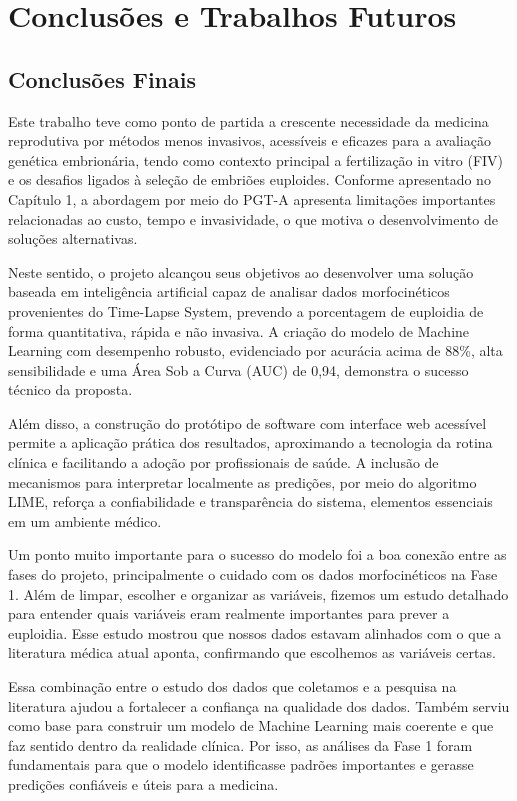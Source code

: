 \chapter[Conclusões e Trabalhos Futuros]{Conclusões e Trabalhos Futuros}

\section{Conclusões Finais}
Este trabalho teve como ponto de partida a crescente necessidade da medicina reprodutiva por métodos menos invasivos, acessíveis e eficazes para a avaliação genética embrionária, tendo como contexto principal a fertilização in vitro (FIV) e os desafios ligados à seleção de embriões euploides. Conforme apresentado no Capítulo 1, a abordagem por meio do PGT-A apresenta limitações importantes relacionadas ao custo, tempo e invasividade, o que motiva o desenvolvimento de soluções alternativas.

Neste sentido, o projeto alcançou seus objetivos ao desenvolver uma solução baseada em inteligência artificial capaz de analisar dados morfocinéticos provenientes do Time-Lapse System, prevendo a porcentagem de euploidia de forma quantitativa, rápida e não invasiva. A criação do modelo de Machine Learning com desempenho robusto, evidenciado por acurácia acima de 88\%, alta sensibilidade e uma Área Sob a Curva (AUC) de 0,94, demonstra o sucesso técnico da proposta.

Além disso, a construção do protótipo de software com interface web acessível permite a aplicação prática dos resultados, aproximando a tecnologia da rotina clínica e facilitando a adoção por profissionais de saúde. A inclusão de mecanismos para interpretar localmente as predições, por meio do algoritmo LIME, reforça a confiabilidade e transparência do sistema, elementos essenciais em um ambiente médico.

Um ponto muito importante para o sucesso do modelo foi a boa conexão entre as fases do projeto, principalmente o cuidado com os dados morfocinéticos na Fase 1. Além de limpar, escolher e organizar as variáveis, fizemos um estudo detalhado para entender quais variáveis eram realmente importantes para prever a euploidia. Esse estudo mostrou que nossos dados estavam alinhados com o que a literatura médica atual aponta, confirmando que escolhemos as variáveis certas.

Essa combinação entre o estudo dos dados que coletamos e a pesquisa na literatura ajudou a fortalecer a confiança na qualidade dos dados. Também serviu como base para construir um modelo de Machine Learning mais coerente e que faz sentido dentro da realidade clínica. Por isso, as análises da Fase 1 foram fundamentais para que o modelo identificasse padrões importantes e gerasse predições confiáveis e úteis para a medicina.

